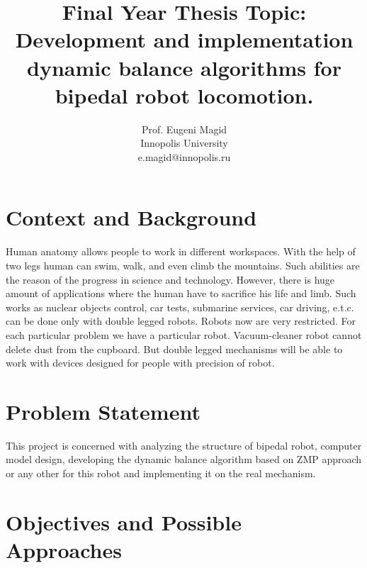 \documentclass[11pt,a4paper]{article}
\begin{document}
 
\title{Final Year Thesis Topic:\\Development and implementation dynamic balance algorithms for bipedal robot locomotion.}
\author{Prof. Eugeni Magid\\\vspace{-4mm}Innopolis University\\e.magid@innopolis.ru}
\date{}

\maketitle

\section{Context and Background}

Human anatomy allows people to work in different workspaces. With the help of two legs human can swim, walk, and even climb the mountains. Such abilities are the reason of the progress in science and technology. However, there is huge amount of  applications where the human have to sacrifice his life and limb. Such works as nuclear objects control, car tests, submarine services, car driving, e.t.c. can be done only with double legged robots. Robots now are very restricted. For each particular problem we have a particular robot. Vacuum-cleaner robot cannot delete dust from the cupboard. But double legged mechanisms will be able to work with devices designed for people with precision of robot. 

\section{Problem Statement}

This project is concerned with analyzing the structure of bipedal robot, computer model design, developing the dynamic balance algorithm based on ZMP approach or any other for this robot and implementing it on the real mechanism.  

\section{Objectives and Possible Approaches}
\end{document}
